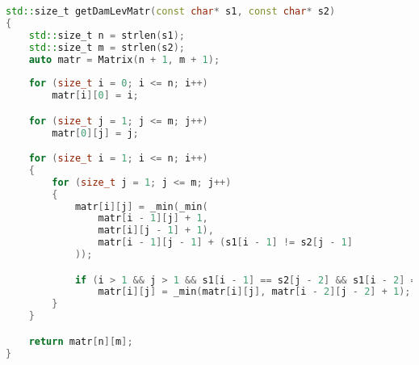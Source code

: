        \begin{lstlisting}[language=C++, label=lst:matr:Dameray-Levenstein, caption=Функция поиска растояния Дамерау-Левенштейна]
std::size_t getDamLevMatr(const char* s1, const char* s2)
{
    std::size_t n = strlen(s1);
    std::size_t m = strlen(s2);
    auto matr = Matrix(n + 1, m + 1);
    
    for (size_t i = 0; i <= n; i++)
        matr[i][0] = i;

    for (size_t j = 1; j <= m; j++)
        matr[0][j] = j;

    for (size_t i = 1; i <= n; i++)
    {
        for (size_t j = 1; j <= m; j++)
        {
            matr[i][j] = _min(_min(
                matr[i - 1][j] + 1,
                matr[i][j - 1] + 1),
                matr[i - 1][j - 1] + (s1[i - 1] != s2[j - 1]
            ));

            if (i > 1 && j > 1 && s1[i - 1] == s2[j - 2] && s1[i - 2] == s2[j - 1])
                matr[i][j] = _min(matr[i][j], matr[i - 2][j - 2] + 1);
        }
    }

    return matr[n][m];
}
        \end{lstlisting}
    
        
